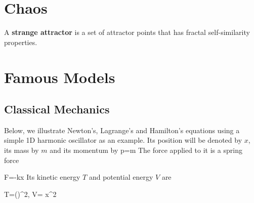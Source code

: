\section{Chaos}

A {\bf strange attractor}
is a set of attractor points that has fractal self-similarity 
properties.

\section{Famous Models}

\OtoAd

\subsection{Classical Mechanics}

Below, we illustrate Newton's, Lagrange's and
Hamilton's equations using a simple 1D harmonic
oscillator as an example. 
Its position 
will be denoted by $x$, its mass by $m$ and its momentum by
\beq
p=m
\eeq
The force applied to it is a spring force

\beq
F=-kx
\eeq
Its kinetic energy $T$
and potential energy $V$
are

\beq
T=()^2\;, \;\;
V= x^2
\eeq



